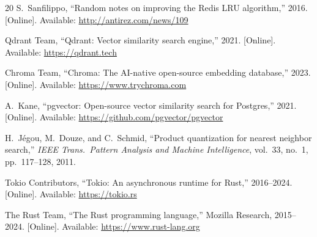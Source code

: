 \documentclass[conference]{IEEEtran}
\begin{document}
\begin{thebibliography}{20}
S.~Sanfilippo, ``Random notes on improving the Redis LRU algorithm,''
2016. [Online]. Available:
\url{http://antirez.com/news/109}

Qdrant Team, ``Qdrant: Vector similarity search engine,'' 2021.
[Online]. Available: \url{https://qdrant.tech}

Chroma Team, ``Chroma: The AI-native open-source embedding database,''
2023. [Online]. Available: \url{https://www.trychroma.com}

A.~Kane, ``pgvector: Open-source vector similarity search for
Postgres,'' 2021. [Online].
Available: \url{https://github.com/pgvector/pgvector}

H.~J\'{e}gou, M.~Douze, and C.~Schmid, ``Product quantization for
nearest neighbor search,'' \emph{IEEE Trans.\ Pattern Analysis and
Machine Intelligence}, vol.~33, no.~1, pp.~117--128, 2011.

Tokio Contributors, ``Tokio: An asynchronous runtime for Rust,''
2016--2024. [Online]. Available: \url{https://tokio.rs}

The Rust Team, ``The Rust programming language,'' Mozilla Research,
2015--2024. [Online]. Available: \url{https://www.rust-lang.org}

\end{thebibliography}
\end{document}
